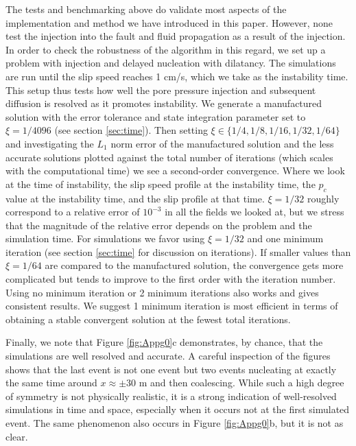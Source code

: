 \documentclass[draft]{agujournal2019}
\begin{document}
The tests and benchmarking above do validate most aspects of the implementation and method we have introduced in this paper. However, none test the injection into the fault and fluid propagation as a result of the injection. In order to check the robustness of the algorithm in this regard, we set up a problem with injection and delayed nucleation with dilatancy. The simulations are run until the slip speed reaches 1 cm/s, which we take as the instability time. This setup thus tests how well the pore pressure injection and subsequent diffusion is resolved as it promotes instability. We generate a manufactured solution with the error tolerance and state integration parameter set to $\xi = 1/4096$ (see section \ref{sec:time}). Then setting $\xi \in \{ 1/4, 1/8, 1/16, 1/32, 1/64  \}$ and investigating the $L_1$ norm error of the manufactured solution and the less accurate solutions plotted against the total number of iterations (which scales with the computational time) we see a second-order convergence. Where we look at the time of instability, the slip speed profile at the instability time, the $p_c$ value at the instability time, and the slip profile at that time. $\xi = 1/32$ roughly correspond to a relative error of $10^{-3}$ in all the fields we looked at, but we stress that the magnitude of the relative error depends on the problem and the simulation time. For simulations we favor using $\xi = 1/32$ and one minimum iteration (see section \ref{sec:time} for discussion on iterations). If smaller values than $\xi = 1/64$ are compared to the manufactured solution, the convergence gets more complicated but tends to improve to the first order with the iteration number. Using no minimum iteration or 2 minimum iterations also works and gives consistent results. We suggest 1 minimum iteration is most efficient in terms of obtaining a stable convergent solution at the fewest total iterations.

Finally, we note that Figure \ref{fig:Appg0}c demonstrates, by chance, that the simulations are well resolved and accurate. A careful inspection of the figures shows that the last event is not one event but two events nucleating at exactly the same time around $x \approx \pm 30$ m and then coalescing. While such a high degree of symmetry is not physically realistic, it is a strong indication of well-resolved simulations in time and space, especially when it occurs not at the first simulated event. The same phenomenon also occurs in Figure \ref{fig:Appg0}b, but it is not as clear.


\newpage


\end{document}
